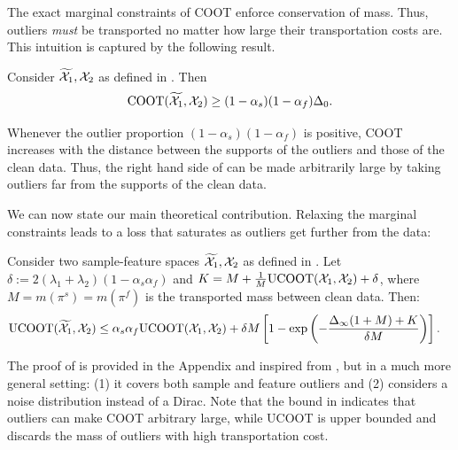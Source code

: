 The exact marginal constraints of COOT enforce conservation of mass.
Thus, outliers \emph{must} be transported no matter how large their transportation costs are.
This intuition is captured by the following result.
\begin{proposition}
Consider $\widetilde{\mathcal X_1}, \mathcal X_2$ as defined in .
Then
\label{prop:coot_not_robust}
\begin{equation}
    \text{COOT}(\widetilde{\mathcal X_1}, \mathcal X_2) \geq (1 - \alpha_s)(1-\alpha_f)\Delta_0.
\end{equation}
\end{proposition}
Whenever the outlier proportion $(1-\alpha_s)(1-\alpha_f)$ is positive,
COOT increases with the distance between the supports of the outliers and those of the clean data.
Thus, the right hand side of  can be made arbitrarily
large by taking outliers far from the supports of the clean data.

We can now state our main theoretical contribution.
Relaxing the marginal constraints leads to a loss that saturates
as outliers get further from the data:
\begin{theorem}
\label{thm:ucoot_robust}
Consider two sample-feature spaces $\widetilde{\mathcal X_1}, \mathcal X_2$ as defined
in . Let $\delta := 2(\lambda_1 + \lambda_2)(1 - \alpha_s\alpha_f)$
and $K = M + \frac{1}{M}\text{UCOOT}(\mathcal X_1, \mathcal X_2) +\delta$,
where $M= m(\pi^s) = m(\pi^f)$ is the transported mass between clean data. Then:
\begin{align} %
  \ucoot(\widetilde{\cX_1}, \cX_2)
  &\leq \alpha_s \alpha_f \ucoot(\cX_1, \cX_2)
  + \delta M \left[ 1 - \exp \left( {- \frac{\Delta_{\infty}(1+M) + K}{\delta M}} \right) \right].
\end{align}
\end{theorem}
The proof of  is provided in the Appendix and
inspired from \citep{Fatras21}, but in a much more general setting:
(1) it covers both sample and feature outliers and
(2) considers a noise distribution instead of a Dirac.
Note that the bound in 
indicates that outliers can make COOT arbitrary large,
while UCOOT is upper bounded and discards the mass of outliers with high transportation cost.

